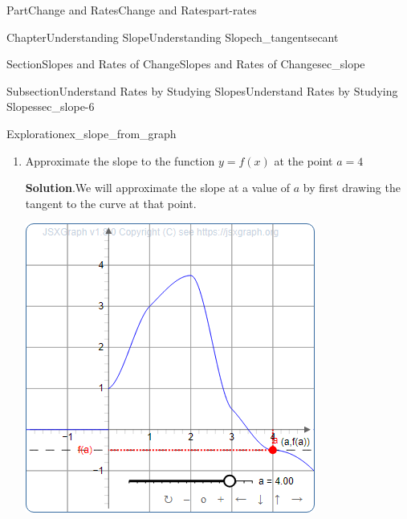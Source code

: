 \documentclass[oneside,10pt,]{tufte-book}
\newcommand{\blocktitlefont}{\relax}
\numberwithin{equation}{chapter}
\begin{document}
\begin{partptx}{Part}{Change and Rates}{}{Change and Rates}{}{}{part-rates}
\begin{chapterptx}{Chapter}{Understanding Slope}{}{Understanding Slope}{}{}{ch_tangentsecant}
\begin{sectionptx}{Section}{Slopes and Rates of Change}{}{Slopes and Rates of Change}{}{}{sec_slope}
\begin{subsectionptx}{Subsection}{Understand Rates by Studying Slopes}{}{Understand Rates by Studying Slopes}{}{}{sec_slope-6}
\begin{exploration}{Exploration}{}{ex_slope_from_graph}
\begin{enumerate}[font=\bfseries,label=(\alph*),ref=\alph*]
\begin{equation*}
m = \dfrac{0.5-3.5}{3-0} = \dfrac{-3}{3} = -1
\end{equation*}
Therefore, the slope of \(f(x)\) at \(a=3\) is equal to -1.%
\item{}Approximate the slope to the function \(y=f(x)\) at the point \(a=4\)%
\par\smallskip%
\noindent\textbf{\blocktitlefont Solution}.\hypertarget{ex_slope_from_graph-5-2}{}\quad{}We will approximate the slope at a value of \(a\) by first drawing the tangent to the curve at that point.%
\begin{sidebyside}{2}{0.075}{0.075}{0.17}%
\begin{sbspanel}{0.47}%
\includegraphics[width=\linewidth]{generated/preview/ex_slope_from_graph-5-2-2-preview.png}
\end{sbspanel}%
\begin{sbspanel}{0.21}%

\end{sbspanel}
\end{sidebyside}
\end{enumerate}
\end{exploration}
\end{subsectionptx}
\end{sectionptx}
\end{chapterptx}
\end{partptx}
\end{document}
